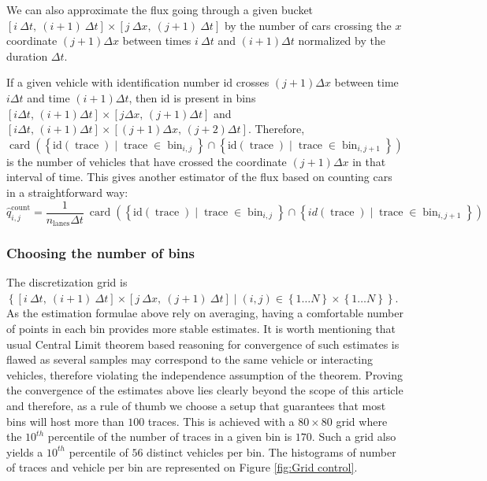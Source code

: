 \documentclass[preprint]{elsarticle}
\DeclareMathOperator{\card}{card}
\DeclareMathOperator{\trc}{trace}
\DeclareMathOperator{\bin}{bin}
\DeclareMathOperator{\lns}{lanes}
\DeclareMathOperator{\cnt}{count}
\begin{document}
We can also approximate the flux going through a given bucket $\left[i\:\Delta t,\:\left(i+1\right)\:\Delta t\right]\times\left[j\:\Delta x,\:\left(j+1\right)\:\Delta t\right]$
by the number of cars crossing the $x$ coordinate $\left(j+1\right)\Delta x$
between times $i\:\Delta t$ and $\left(i+1\right)\Delta t$ normalized
by the duration $\Delta t$.

If a given vehicle with identification number id crosses $\left(j+1\right)\Delta x$
between time $i\Delta t$ and time $\left(i+1\right)\Delta t$,
then id is present in bins $\left[i\Delta t,\,\left(i+1\right)\Delta t\right]\times\left[j\Delta x,\,\left(j+1\right)\Delta t\right]$
and $\left[i\Delta t,\,\left(i+1\right)\Delta t\right]\times\left[\left(j+1\right)\Delta x,\,\left(j+2\right)\Delta t\right]$.
Therefore, $\card\left(\left\{ \text{id}\left(\trc \right)\mid \trc \in \bin_{i,j}\right\} \cap\left\{ \text{id} \left(\trc\right)\mid \trc\in \bin_{i,j+1}\right\} \right)$
is the number of vehicles that have crossed the coordinate $\left(j+1\right)\Delta x$
in that interval of time. This gives another estimator of the flux
based on counting cars in a straightforward way: 
\[
\widehat{q}_{i,j}^{\cnt}=\frac{1}{n_{\lns}\Delta t}\: \card\left(\left\{ \text{id} \left(\trc\right)\mid \trc \in \bin_{i,j}\right\} \cap\left\{ id\left( \trc \right)\mid \trc\in \bin_{i,j+1}\right\} \right)
\]



\subsubsection{Choosing the number of bins}

The discretization grid is $\left\{ \left[i\:\Delta t,\:\left(i+1\right)\:\Delta t\right]\times\left[j\:\Delta x,\:\left(j+1\right)\:\Delta t\right]\mid\left(i,j\right)\in\left\{ 1\ldots N\right\} \times\left\{ 1\ldots N\right\} \right\} $.
As the estimation formulae above rely on averaging, having a comfortable
number of points in each bin provides more stable estimates. It is
worth mentioning that usual Central Limit theorem based reasoning
for convergence of such estimates is flawed as several samples may
correspond to the same vehicle or interacting vehicles, therefore
violating the independence assumption of the theorem. Proving the
convergence of the estimates above lies clearly beyond the scope of
this article and therefore, as a rule of thumb we choose a setup that
guarantees that most bins will host more than $100$ traces. This
is achieved with a $80\times80$ grid where the $10^{th}$ percentile
of the number of traces in a given bin is $170$. Such a grid also
yields a $10^{th}$ percentile of $56$ distinct vehicles per bin.
The histograms of number of traces and vehicle per bin are represented
on Figure \ref{fig:Grid control}.
\end{document}

